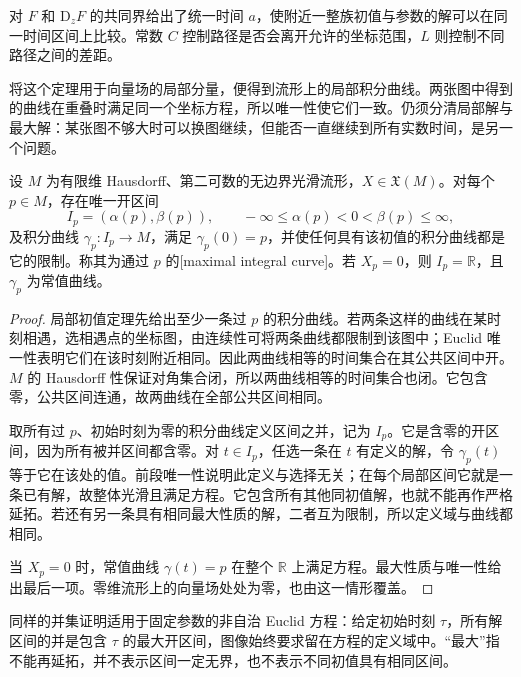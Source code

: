 对 \(F\) 和 \(\mathrm{D}_zF\) 的共同界给出了统一时间 \(a\)，使附近一整族初值与参数的解可以在同一时间区间上比较。常数 \(C\) 控制路径是否会离开允许的坐标范围，\(L\) 则控制不同路径之间的差距。

\ProseParagraphBreak

将这个定理用于向量场的局部分量，便得到流形上的局部积分曲线。两张图中得到的曲线在重叠时满足同一个坐标方程，所以唯一性使它们一致。仍须分清局部解与最大解：某张图不够大时可以换图继续，但能否一直继续到所有实数时间，是另一个问题。

\begin{theorem}
	\label{g1:thm:maximal-integral-curve}
	设 \(M\) 为有限维 Hausdorff、第二可数的无边界光滑流形，\(X\in\mathfrak X(M)\)。对每个 \(p\in M\)，存在唯一开区间
	\[
		I_p=(\alpha(p),\beta(p)),\qquad -\infty\leq\alpha(p)<0<\beta(p)\leq\infty,
	\]
	及积分曲线 \(\gamma_p:I_p\to M\)，满足 \(\gamma_p(0)=p\)，并使任何具有该初值的积分曲线都是它的限制。称其为通过 \(p\) 的[maximal integral curve]。若 \(X_p=0\)，则 \(I_p=\mathbb R\)，且 \(\gamma_p\) 为常值曲线。
\end{theorem}
\begin{proof}
	局部初值定理先给出至少一条过 \(p\) 的积分曲线。若两条这样的曲线在某时刻相遇，选相遇点的坐标图，由连续性可将两条曲线都限制到该图中；Euclid 唯一性表明它们在该时刻附近相同。因此两曲线相等的时间集合在其公共区间中开。\(M\) 的 Hausdorff 性保证对角集合闭，所以两曲线相等的时间集合也闭。它包含零，公共区间连通，故两曲线在全部公共区间相同。

	取所有过 \(p\)、初始时刻为零的积分曲线定义区间之并，记为 \(I_p\)。它是含零的开区间，因为所有被并区间都含零。对 \(t\in I_p\)，任选一条在 \(t\) 有定义的解，令 \(\gamma_p(t)\) 等于它在该处的值。前段唯一性说明此定义与选择无关；在每个局部区间它就是一条已有解，故整体光滑且满足方程。它包含所有其他同初值解，也就不能再作严格延拓。若还有另一条具有相同最大性质的解，二者互为限制，所以定义域与曲线都相同。

	当 \(X_p=0\) 时，常值曲线 \(\gamma(t)=p\) 在整个 \(\mathbb R\) 上满足方程。最大性质与唯一性给出最后一项。零维流形上的向量场处处为零，也由这一情形覆盖。
\end{proof}

同样的并集证明适用于固定参数的非自治 Euclid 方程：给定初始时刻 \(\tau\)，所有解区间的并是包含 \(\tau\) 的最大开区间，图像始终要求留在方程的定义域中。“最大”指不能再延拓，并不表示区间一定无界，也不表示不同初值具有相同区间。


